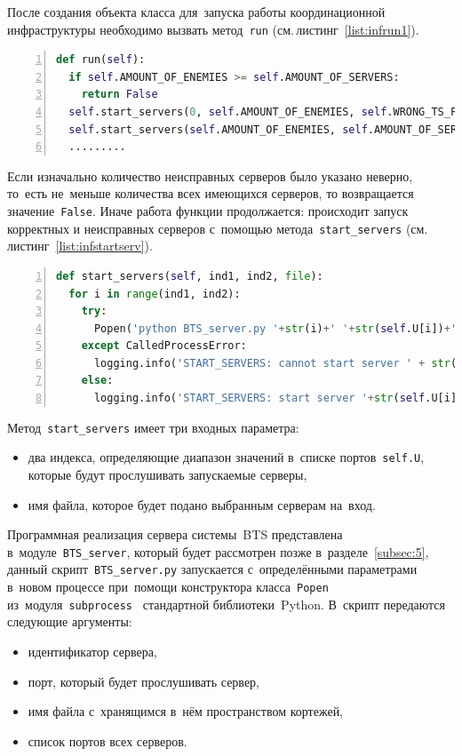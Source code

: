 После создания объекта класса для~запуска работы координационной инфраструктуры необходимо вызвать метод~\texttt{run} (см.\,листинг~\ref{list:infrun1}).
\begin{ListingEnv}\caption{Модуль~\texttt{BTS\_infrastructure}, метод~\texttt{run}}\label{list:infrun1}
\begin{lstlisting}[language=Python, numbers=left]
def run(self):
  if self.AMOUNT_OF_ENEMIES >= self.AMOUNT_OF_SERVERS:
    return False
  self.start_servers(0, self.AMOUNT_OF_ENEMIES, self.WRONG_TS_FILE)
  self.start_servers(self.AMOUNT_OF_ENEMIES, self.AMOUNT_OF_SERVERS, self.TS_FILE)
  .........
	\end{lstlisting}
\end{ListingEnv}
Если изначально количество неисправных серверов было указано неверно, то~есть не~меньше количества всех имеющихся серверов, то возвращается значение~\texttt{False}. Иначе работа функции продолжается: происходит запуск корректных и неисправных серверов с~помощью метода~\texttt{start_servers} (см.\,листинг~\ref{list:infstartserv}).
\begin{ListingEnv}\caption{Модуль~\texttt{BTS\_infrastructure}, метод~\texttt{start\_servers}}\label{list:infstartserv}
	\begin{lstlisting}[language=Python, numbers=left]
def start_servers(self, ind1, ind2, file):
  for i in range(ind1, ind2):
    try:
      Popen('python BTS_server.py '+str(i)+' '+str(self.U[i])+' '+str(file)+' '+''.join(str(j)+' ' for j in self.U), stdout=PIPE, stderr=PIPE, shell=True)
    except CalledProcessError:
      logging.info('START_SERVERS: cannot start server ' + str(self.U[i]))
    else:
      logging.info('START_SERVERS: start server '+str(self.U[i]))
	\end{lstlisting}
\end{ListingEnv}
Метод~\texttt{start_servers} имеет три входных параметра:
\begin{itemize}
	\item два индекса, определяющие диапазон значений в~списке портов~\texttt{self.U}, которые будут прослушивать запускаемые серверы,
	\item имя файла, которое будет подано выбранным серверам на~вход.
\end{itemize}
Программная реализация сервера системы~BTS представлена в~модуле~\texttt{BTS_server}, который будет рассмотрен позже в~разделе~\ref{subsec:5}, данный скрипт~\texttt{BTS_server.py} запускается с~определёнными параметрами в~новом процессе при~помощи конструктора класса~\texttt{Popen} из~модуля~\texttt{subprocess}~\autocite{subprocess} стандартной библиотеки~Python. В~скрипт передаются следующие аргументы:
\begin{itemize}
	\item идентификатор сервера,
	\item порт, который будет прослушивать сервер,
	\item имя файла с~хранящимся в~нём пространством кортежей,
	\item список портов всех серверов.
\end{itemize}

